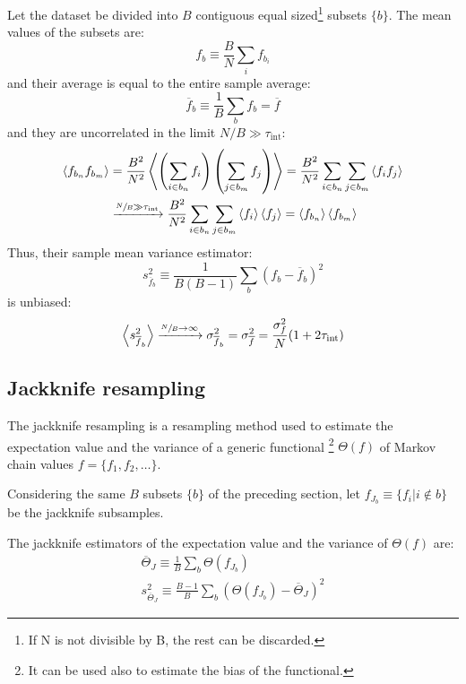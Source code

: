 Let the dataset be divided into $B$ contiguous equal sized\footnote{If N is not divisible by B, the rest can be discarded.} subsets $\{b\}$.
The mean values of the subsets are:
\[
    f_b \equiv \frac{B}{N}\sum_i f_{b_i}
\]
and their average is equal to the entire sample average:
\[
    \overline f_b \equiv \frac{1}{B} \sum_b f_b = \overline f
\]
and they are uncorrelated in the limit $N/B\gg\tau_\mathrm{int}$:
\[\begin{aligned}
    \left<f_{b_n}f_{b_m}\right> &= \frac{B^2}{N^2}\left<\left(\sum_{i\in b_n} f_i\right)\left(\sum_{j\in b_m}f_j\right)\right> 
                                = \frac{B^2}{N^2}\sum_{i\in b_n} \sum_{j\in b_m} \left<f_i f_j\right> \\
                                &\xrightarrow{\sfrac{N}{B}\gg\tau_\mathrm{int}} \frac{B^2}{N^2}\sum_{i\in b_n} \sum_{j\in b_m} \left<f_i\right> \left<f_j\right> 
                                = \left<f_{b_n}\right>\left<f_{b_m}\right>
\end{aligned}\]
Thus, their sample mean variance estimator:
\[
    s_{\overline f_b}^2 \equiv \frac{1}{B(B-1)}\sum_b \left(f_b - \overline f_b\right)^2
\]
is unbiased:
\[
    \left<s_{\overline f_b}^2\right> \xrightarrow{\sfrac{N}{B}\to\infty} \sigma_{\overline f_b}^2 = \sigma_{\overline f}^2 = \frac{\sigma_f^2}{N}(1+2\tau_\mathrm{int})
\]

\subsection*{Jackknife resampling} 
The jackknife resampling \cite{efron:1992} is a resampling method used to estimate the expectation value and the variance of a generic functional%
\footnote{It can be used also to estimate the bias of the functional.} $\Theta(f)$ of Markov chain values $f=\{f_1,f_2,\ldots\}$.

Considering the same $B$ subsets $\{b\}$ of the preceding section,
let $f_{J_b} \equiv \{f_i | i\notin b\}$ be the jackknife subsamples.

The jackknife estimators of the expectation value and the variance of $\Theta(f)$ are:
\[\begin{gathered}
    \overline \Theta_J \equiv \frac{1}{B} \sum_b \Theta(f_{J_b}) \\
    s_{\overline \Theta_J}^2 \equiv \frac{B-1}{B}\sum_b \left(\Theta(f_{J_b})-\overline\Theta_J\right)^2
\end{gathered}\]

